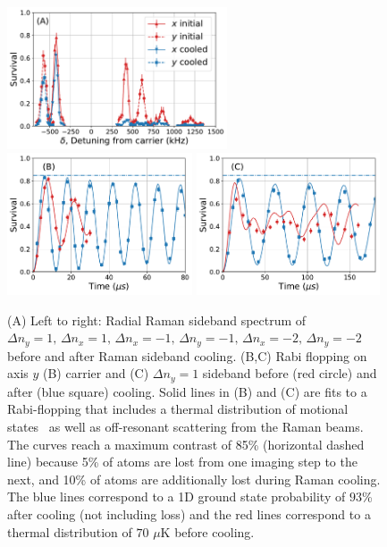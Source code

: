 \documentclass[aps,prl,twocolumn,groupedaddress]{revtex4-1}
\begin{document}
\begin{figure}
  \includegraphics[height=4.2cm]{imgs/spectrum_r.pdf}
  \includegraphics[height=4.2cm]{imgs/rabi_flop_r3_0.pdf}
  \includegraphics[height=4.2cm]{imgs/rabi_flop_r3_p1.pdf}
  \caption{(A) Left to right: Radial Raman sideband spectrum of $\Delta n_y=1,\,\Delta n_x=1,\,\Delta n_x=-1,\,\Delta n_y=-1,\,\Delta n_x=-2,\,\Delta n_y=-2$  before and after Raman sideband cooling.
    (B,C) Rabi flopping on axis $y$ (B) carrier and (C) $\Delta n_y=1$  sideband
    before (red circle) and after (blue square) cooling.
    Solid lines in (B) and (C) are
    fits to a Rabi-flopping that includes a thermal distribution of motional states~\cite{Meekhof1996}  as well as off-resonant scattering from the Raman beams.  The curves reach a maximum contrast of 85\% (horizontal dashed line) because 5\% of atoms are lost from one imaging step to the next, and 10\% of atoms are additionally lost during Raman cooling.
    The blue lines correspond to a 1D ground state probability of $93$\% after cooling (not including loss) and
    the red lines correspond to a thermal distribution of $70$ $\mu$K before cooling.
    \label{f-radial}}
\end{figure}
\end{document}

